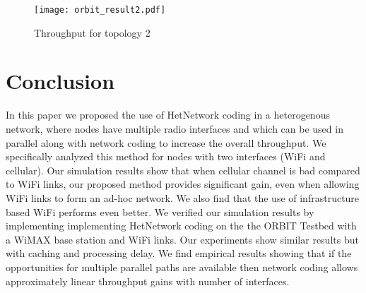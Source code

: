 \documentclass{sig-alternate-10pt}
\begin{document}
\begin{figure}[t]
\texttt{[image: orbit\_result2.pdf]}
\caption{Throughput for topology 2}
\label{fig:orbitres2}
\end{figure}


\section{Conclusion}
In this paper we proposed the use of HetNetwork coding  in a heterogenous  network, where nodes have multiple radio interfaces and which can be used in parallel along with network coding to increase the overall throughput. We specifically analyzed this method for nodes with two interfaces (WiFi and cellular). Our simulation results show that when cellular channel is bad compared to WiFi links, our proposed method provides significant gain, even when allowing WiFi links to form an ad-hoc network. We also find that the use of infrastructure based WiFi performs even better. We verified our simulation results by implementing implementing HetNetwork coding on the the ORBIT Testbed with a WiMAX base station and WiFi links. Our experiments show similar results but with caching and processing delay. We find empirical results showing that if the opportunities for multiple parallel paths are available then network coding allows approximately linear throughput gains with number of interfaces.




\end{document}
